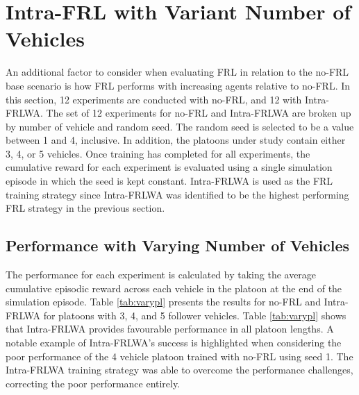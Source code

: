 \section{Intra-FRL with Variant Number of Vehicles}
An additional factor to consider when evaluating FRL in relation to the no-FRL base 
scenario is how FRL performs with increasing agents relative to no-FRL.  In this section, 
12 experiments are conducted with no-FRL, and 12 with Intra-FRLWA. The set of 12 
experiments for no-FRL and Intra-FRLWA are broken up by number of vehicle and random 
seed.  The random seed is selected to be a value between 1 and 4, inclusive. In addition, 
the platoons under study contain either 3, 4, or 5 vehicles. Once training has completed 
for all experiments, the cumulative reward for each experiment is evaluated using a single 
simulation episode in which the seed is kept constant.  Intra-FRLWA is used as the FRL 
training strategy since Intra-FRLWA was identified to be the highest performing FRL 
strategy in the previous section. 

\subsection{Performance with Varying Number of Vehicles}
The performance for each experiment is calculated by taking the average cumulative episodic 
reward across each vehicle in the platoon at the end of the simulation episode.  Table 
\ref{tab:varypl} presents the results for no-FRL and Intra-FRLWA for platoons with 3, 4, 
and 5 follower vehicles. Table \ref{tab:varypl} shows that Intra-FRLWA provides 
favourable performance in all platoon lengths. A notable example of Intra-FRLWA's success 
is highlighted when considering the poor performance of the 4 vehicle platoon trained with 
no-FRL using seed 1. The Intra-FRLWA training strategy was able to overcome the performance 
challenges, correcting the poor performance entirely.

